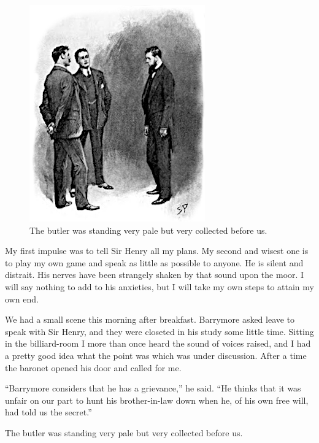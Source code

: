 \documentclass[paper=5.5in:8.5in,BCOR=7mm,twoside,DIV=calc,12pt,usegeometry,openany,chapterprefix,endperiod]{scrbook} %
\begin{document}
\begin{figure}
\centering
\includegraphics[width=.7\linewidth]{10_butlerstand}
\caption{The butler was standing very pale but very collected before us.}
\end{figure}

My first impulse was to tell Sir Henry all my plans. My second and wisest one is to play my own game and speak as little as possible to anyone. He is silent and distrait. His nerves have been strangely shaken by that sound upon the moor. I will say nothing to add to his anxieties, but I will take my own steps to attain my own end.

We had a small scene this morning after breakfast. Barrymore asked leave to speak with Sir Henry, and they were closeted in his study some little time. Sitting in the billiard-room I more than once heard the sound of voices raised, and I had a pretty good idea what the point was which was under discussion. After a time the baronet opened his door and called for me.

\enquote{Barrymore considers that he has a grievance,} he said. \enquote{He thinks that it was unfair on our part to hunt his brother-in-law down when he, of his own free will, had told us the secret.}

The butler was standing very pale but very collected before us.

\end{document}
